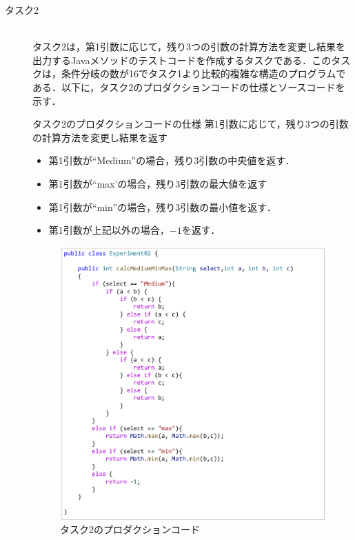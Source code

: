 \documentclass[12pt]{jarticle} %
\begin{document}
\begin{description}
\item[タスク2]~\\
タスク2は，第1引数に応じて，残り3つの引数の計算方法を変更し結果を出力するJavaメソッドのテストコードを作成するタスクである．このタスクは，条件分岐の数が16でタスク1より比較的複雑な構造のプログラムである．以下に，タスク2のプロダクションコードの仕様とソースコードを示す．

\begin{itembox}[l]{タスク2のプロダクションコードの仕様}
第1引数に応じて，残り3つの引数の計算方法を変更し結果を返す
\begin{itemize}
\item 第1引数が``Medium''の場合，残り3引数の中央値を返す．
\item 第1引数が``max'の場合，残り3引数の最大値を返す
\item 第1引数が``min''の場合，残り3引数の最小値を返す．
\item 第1引数が上記以外の場合，$-1$を返す．
\end{itemize}
\end{itembox}

\begin{figure}[htbp]
  \begin{center}
    \includegraphics[clip,width=13cm]{E2.pdf}
    \caption{タスク2のプロダクションコード}
    \label{E2}
  \end{center}
\end{figure}



\end{description}
\end{document}
